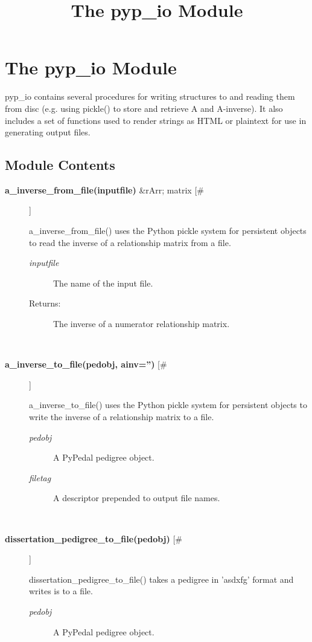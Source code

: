 \documentclass[10pt]{article}
\title{The pyp\_io Module}
\begin{document}
\section*{The pyp\_io Module}


 pyp\_io contains several procedures for writing structures to and reading them from disc (e.g. using pickle() to store and retrieve A and A-inverse). It also includes a set of functions used to render strings as HTML or plaintext for use in generating output files.
\subsection*{Module Contents}
\begin{description}
\item[\textbf{a\_inverse\_from\_file(inputfile)}
 \&rArr; matrix [\#]]

 a\_inverse\_from\_file() uses the Python pickle system for persistent objects to read the inverse of a relationship matrix from a file.
\begin{description}
\item[\emph{inputfile}
] The name of the input file.
\item[Returns:] The inverse of a numerator relationship matrix.

\end{description}
\\ 

\item[\textbf{a\_inverse\_to\_file(pedobj, ainv='')}
 [\#]]

 a\_inverse\_to\_file() uses the Python pickle system for persistent objects to write the inverse of a relationship matrix to a file.
\begin{description}
\item[\emph{pedobj}
] A PyPedal pedigree object.
\item[\emph{filetag}
] A descriptor prepended to output file names.

\end{description}
\\ 

\item[\textbf{dissertation\_pedigree\_to\_file(pedobj)}
 [\#]]

 dissertation\_pedigree\_to\_file() takes a pedigree in 'asdxfg' format and writes is to a file.
\begin{description}
\item[\emph{pedobj}
] A PyPedal pedigree object.


\end{description}
\end{description}
\end{document}
